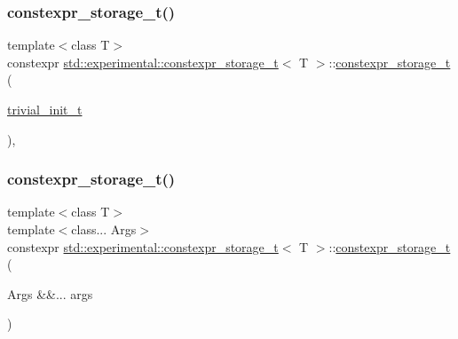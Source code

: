 \subsubsection{\texorpdfstring{constexpr\+\_\+storage\+\_\+t()}{constexpr\_storage\_t()}\hspace{0.1cm}{\footnotesize\ttfamily [1/2]}}
{\footnotesize\ttfamily template$<$class T$>$ \\
constexpr \mbox{\hyperlink{unionstd_1_1experimental_1_1constexpr__storage__t}{std\+::experimental\+::constexpr\+\_\+storage\+\_\+t}}$<$ T $>$\+::\mbox{\hyperlink{unionstd_1_1experimental_1_1constexpr__storage__t}{constexpr\+\_\+storage\+\_\+t}} (\begin{DoxyParamCaption}\item[{\mbox{\hyperlink{structstd_1_1experimental_1_1trivial__init__t}{trivial\+\_\+init\+\_\+t}}}]{ }\end{DoxyParamCaption})\hspace{0.3cm}{\ttfamily [inline]}, {\ttfamily [noexcept]}}

\mbox{\label{unionstd_1_1experimental_1_1constexpr__storage__t_a643de5b95dac28e87811c7ff4890cd19}} 
\subsubsection{\texorpdfstring{constexpr\+\_\+storage\+\_\+t()}{constexpr\_storage\_t()}\hspace{0.1cm}{\footnotesize\ttfamily [2/2]}}
{\footnotesize\ttfamily template$<$class T$>$ \\
template$<$class... Args$>$ \\
constexpr \mbox{\hyperlink{unionstd_1_1experimental_1_1constexpr__storage__t}{std\+::experimental\+::constexpr\+\_\+storage\+\_\+t}}$<$ T $>$\+::\mbox{\hyperlink{unionstd_1_1experimental_1_1constexpr__storage__t}{constexpr\+\_\+storage\+\_\+t}} (\begin{DoxyParamCaption}\item[{Args \&\&...}]{args }\end{DoxyParamCaption})\hspace{0.3cm}{\ttfamily [inline]}}

